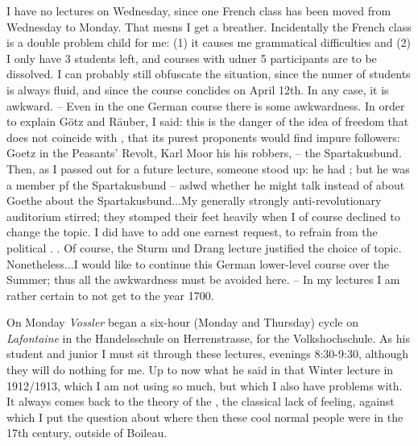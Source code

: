 
I have no lectures on Wednesday, since one French class has been moved from Wednesday to Monday. That mesns I get a breather. Incidentally the French class is a double problem child for me: (1) it causes me grammatical difficulties and (2) I only have 3 students left, and courses with udner 5 participants are to be dissolved. I can probably still obfuscate the situation, since the numer of students is always fluid, and since the course conclides on April 12th. In any case, it is awkward. -- Even in the one German course there is some awkwardness. In order to explain Götz and Räuber, I said: this is the danger of the idea of freedom that does not coincide with , that its purest proponents would find impure followers: Goetz in the Peasants' Revolt, Karl Moor his his robbers, -- the Spartakusbund. Then, as I passed out  for a future lecture, someone stood up: he had ; but he was a member pf the Spartakusbund -- aslwd whether he might talk instead of about Goethe about the Spartakusbund...My generally strongly anti-revolutionary auditorium stirred; they stomped their feet heavily when I of course declined to change the topic. I did have to add one earnest request, to refrain from the political . . Of course, the Sturm und Drang lecture justified the choice of topic. Nonetheless...I would like to continue this German lower-level course over the Summer; thus all the awkwardness must be avoided here. -- In my lectures I am rather certain to not get to the year 1700.

On Monday \textit{Vossler} began a six-hour (Monday and Thursday) cycle on \textit{Lafontaine} in the Handelsschule on Herrenstrasse, for the Volkshochschule. As his student and junior I must sit through these lectures, evenings 8:30-9:30, although they will  do nothing for me. Up to now  what he said in that Winter lecture in 1912/1913, which I am not using so much, but which I also have problems with. It always comes back to the theory of the , the classical lack of feeling, against which I put the question about where then these cool normal people were in the 17th century, outside of Boileau.

